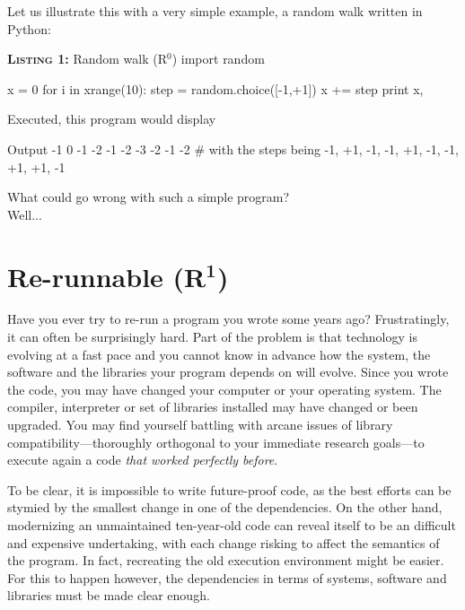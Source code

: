 \documentclass[a4paper,11pt]{article}
\begin{document}
Let us illustrate this with a very simple example,
a random walk written in Python:

\begin{code}{\textbf{\textsc{Listing 1:}} Random walk (R$^0$)}
import random

x = 0
for i in xrange(10):
    step = random.choice([-1,+1])
    x += step
    print x,
\end{code}

Executed, this program would display 
\begin{code}{Output}
-1  0 -1 -2 -1 -2 -3 -2 -1 -2 # with the steps being -1, +1, -1, -1, +1, -1, -1, +1, +1, -1
\end{code}

What could go wrong with such a simple program?\\
\vfill
Well...
\vfill


\clearpage
\section*{Re-runnable (R$^{\mathbf 1}$)}

Have you ever try to re-run a program you wrote some years ago?
Frustratingly, it can often be surprisingly hard. 
Part of the problem is that technology is evolving at a fast pace
and you cannot  know in advance
how the system, the software and the libraries your program depends on will evolve.
Since you wrote the code,
you may have changed your computer or your operating system.
The compiler, interpreter or set of libraries installed may have changed or been upgraded. 
You may find yourself battling with
arcane issues of library compatibility---thoroughly orthogonal to your immediate research goals---to execute again a code \emph{that worked perfectly before}. 

To be clear, it is impossible to write future-proof code,
as the best efforts can be stymied by the smallest change in one of the dependencies.
On the other hand, modernizing an unmaintained ten-year-old code
can reveal itself to be an difficult and expensive undertaking,
with each change risking to affect the semantics of the program.
In fact, recreating the old execution environment
might be easier.
For this to happen however,
the dependencies in terms of systems, software and libraries
must be made clear enough.
\end{document}
